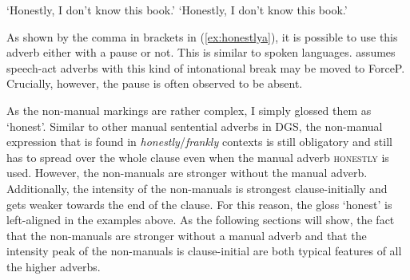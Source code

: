 \begin{exe}
\ex\label{ex:honestly}\begin{xlist}
\ex {} 
\glt `Honestly, I don't know this book.' \label{ex:honestlya}
\ex {}
\glt `Honestly, I don't know this book.' \label{ex:honestlyb}


\end{xlist}
\end{exe}

\noindent As shown by the comma in brackets in (\ref{ex:honestlya}), it is possible to use this adverb either with a pause or not. This is similar to spoken languages. \citet[84]{cinque1999adverbs} assumes speech-act adverbs with this kind of intonational break may be moved to ForceP. Crucially, however, the pause is often observed to be absent. 

As the non-manual markings are rather complex, I simply glossed them as `honest'. Similar to other manual sentential adverbs in DGS, the non-manual expression that is found in \textit{honestly}/\textit{frankly} contexts is still obligatory and still has to spread over the whole clause even when the manual adverb \textsc{honestly} is used. However, the non-manuals are stronger without the manual adverb. Additionally, the intensity of the non-manuals is strongest clause-initially and gets weaker towards the end of the clause. For this reason, the gloss `honest' is left-aligned in the examples above. As the following sections will show, the fact that the non-manuals are stronger without a manual adverb and that the intensity peak of the non-manuals is clause-initial are both typical features of all the higher adverbs.

